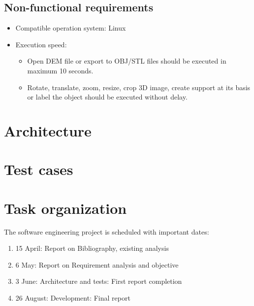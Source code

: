 \documentclass[11pt]{article}
\begin{document}
\subsection{Non-functional requirements}
\begin{itemize}
\item Compatible operation system: Linux
\item Execution speed: 
\begin{itemize}
\item Open DEM file or export to OBJ/STL files should be executed in maximum 10 seconds. 
\item Rotate, translate, zoom, resize, crop 3D image, create support at its basis or label the object should be executed without delay. 
\end{itemize}
\end{itemize}

\section{Architecture}

\section{Test cases}

\section{Task organization}
The software engineering project is scheduled with important dates:
\begin{enumerate}
\item 15 April: Report on Bibliography, existing analysis
\item 6 May: Report on Requirement analysis and objective
\item 3 June: Architecture and tests: First report completion
\item 26 August: Development: Final report
\end{enumerate}
\end{document}
